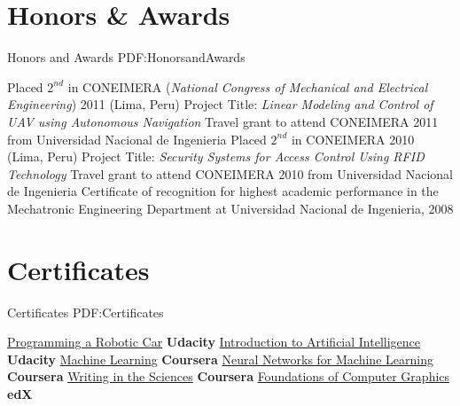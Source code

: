 \documentclass[letterpaper,MMMyyyy,nonstop]{simpleresumecv}
\begin{document}
\begin{body}

\section
{Honors \newline
\& Awards}
{Honors and Awards}
{PDF:HonorsandAwards}

\GapNoBreak
\BulletItem
Placed $2^{nd}$ in CONEIMERA (\textit{National Congress of Mechanical and Electrical Engineering}) 2011 (Lima, Peru)
\SubBulletItem
Project Title: \textit{Linear Modeling and Control of UAV using Autonomous Navigation}
\GapNoBreak
\BulletItem
Travel grant to attend CONEIMERA 2011 from Universidad Nacional de Ingenieria
\GapNoBreak
\BulletItem
Placed $2^{nd}$ in CONEIMERA 2010 (Lima, Peru)
\SubBulletItem
Project Title: \textit{Security Systems for Access Control Using RFID Technology}
\GapNoBreak
\BulletItem
Travel grant to attend CONEIMERA 2010 from Universidad Nacional de Ingenieria
\GapNoBreak
\BulletItem
Certificate of recognition for highest academic performance in the Mechatronic Engineering Department at Universidad Nacional de Ingenieria, 2008


\section
{Certificates}
{Certificates}
{PDF:Certificates}

\GapNoBreak
\BulletItem
\href{https://github.com/davidlavy88/resume/blob/master/Certificates/robotic-car-certificate.pdf}
{Programming a Robotic Car}
\hfill
\textbf{Udacity}
\GapNoBreak
\BulletItem
\href{https://github.com/davidlavy88/resume/blob/master/Certificates/artificial-intelligence-certificate.pdf}
{Introduction to Artificial Intelligence}
\hfill
\textbf{Udacity}
\GapNoBreak
\BulletItem
\href{https://github.com/davidlavy88/resume/blob/master/Certificates/machine-learning-certificate.pdf}
{Machine Learning}
\hfill
\textbf{Coursera}
\GapNoBreak
\BulletItem
\href{https://github.com/davidlavy88/resume/blob/master/Certificates/nn-for-ml-certificate.pdf}
{Neural Networks for Machine Learning}
\hfill
\textbf{Coursera}
\GapNoBreak
\BulletItem
\href{https://github.com/davidlavy88/resume/blob/master/Certificates/writing-in-sciences-certificate.pdf}
{Writing in the Sciences}
\hfill
\textbf{Coursera}
\GapNoBreak
\BulletItem
\href{https://github.com/davidlavy88/resume/blob/master/Certificates/cs184-certificate.pdf}
{Foundations of Computer Graphics}
\hfill
\textbf{edX}


\end{body}
\end{document}
